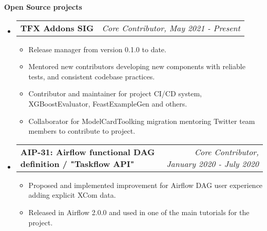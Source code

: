 \documentclass[letterpaper,10pt]{article}
\makeatletter
\newcommand{\resitem}[1]{\item #1 \vspace{-2pt}}
\newcommand{\resheading}[1]{{\large \colorbox{mygrey}{\begin{minipage}{\textwidth}{\textbf{#1 \vphantom{p\^{E}}}}\end{minipage}}}}
\newcommand{\ressubheading}[4]{
\begin{tabular*}{7.0in}{l@{\extracolsep{\fill}}r}
		\textbf{#1} & \textit{#4} \\
\end{tabular*}\vspace{-6pt}}
\makeatother
\begin{document}
\resheading{Open Source projects}
	\begin{itemize}
\item 
		\ressubheading{TFX Addons SIG}{Boulder, CO}{Core Contributor}{Core Contributor, May 2021 - Present}
			\begin{itemize}
				\resitem{Release manager from version 0.1.0 to date.}
				\resitem{Mentored new contributors developing new components with reliable tests, and consistent codebase practices.}
				\resitem{Contributor and maintainer for project CI/CD system, XGBoostEvaluator, FeastExampleGen and others.}
				\resitem{Collaborator for ModelCardToolking migration mentoring Twitter team members to contribute to project.} 
			\end{itemize}
		\item
			\ressubheading{
AIP-31: Airflow functional DAG definition / "Taskflow API"}{Boulder, CO, USA}{ML Engineer}{Core Contributor, January 2020 - July 2020}
			\begin{itemize}
				\resitem{Proposed and implemented improvement for Airflow DAG user experience adding explicit XCom data.}
				\resitem{Released in Airflow 2.0.0 and used in one of the main tutorials for the project.}
				
			\end{itemize}
			
	\end{itemize}

	
\end{document}
